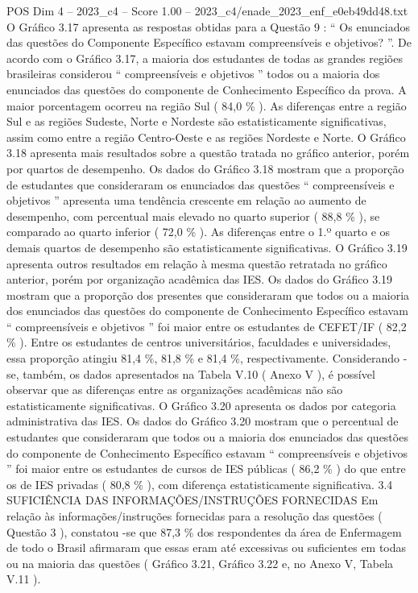 \begin{textsample}{POS Dim 4 – 2023\_c4 – Score 1.00 – 2023\_c4/enade\_2023\_enf\_e0eb49dd48.txt}
O Gráfico 3.17 apresenta as respostas obtidas para a Questão 9 : “ Os enunciados das questões do Componente Específico estavam compreensíveis e objetivos? ”.
De acordo com o Gráfico 3.17, a maioria dos estudantes de todas as grandes regiões brasileiras considerou “ compreensíveis e objetivos ” todos ou a maioria dos enunciados das questões do componente de Conhecimento Específico da prova.
A maior porcentagem ocorreu na região Sul ( 84,0 \% ).
As diferenças entre a região Sul e as regiões Sudeste, Norte e Nordeste são estatisticamente significativas, assim como entre a região Centro-Oeste e as regiões Nordeste e Norte.
O Gráfico 3.18 apresenta mais resultados sobre a questão tratada no gráfico anterior, porém por quartos de desempenho.
Os dados do Gráfico 3.18 mostram que a proporção de estudantes que consideraram os enunciados das questões “ compreensíveis e objetivos ” apresenta uma tendência crescente em relação ao aumento de desempenho, com percentual mais elevado no quarto superior ( 88,8 \% ), se comparado ao quarto inferior ( 72,0 \% ).
As diferenças entre o 1.º quarto e os demais quartos de desempenho são estatisticamente significativas.
O Gráfico 3.19 apresenta outros resultados em relação à mesma questão retratada no gráfico anterior, porém por organização acadêmica das IES.
Os dados do Gráfico 3.19 mostram que a proporção dos presentes que consideraram que todos ou a maioria dos enunciados das questões do componente de Conhecimento Específico estavam “ compreensíveis e objetivos ” foi maior entre os estudantes de CEFET/IF ( 82,2 \% ).
Entre os estudantes de centros universitários, faculdades e universidades, essa proporção atingiu 81,4 \%, 81,8 \% e 81,4 \%, respectivamente.
Considerando -se, também, os dados apresentados na Tabela V.10 ( Anexo V ), é possível observar que as diferenças entre as organizações acadêmicas não são estatisticamente significativas.
O Gráfico 3.20 apresenta os dados por categoria administrativa das IES.
Os dados do Gráfico 3.20 mostram que o percentual de estudantes que consideraram que todos ou a maioria dos enunciados das questões do componente de Conhecimento Específico estavam “ compreensíveis e objetivos ” foi maior entre os estudantes de cursos de IES públicas ( 86,2 \% ) do que entre os de IES privadas ( 80,8 \% ), com diferença estatisticamente significativa. 3.4 SUFICIÊNCIA DAS INFORMAÇÕES/INSTRUÇÕES FORNECIDAS Em relação às informações/instruções fornecidas para a resolução das questões ( Questão 3 ), constatou -se que 87,3 \% dos respondentes da área de Enfermagem de todo o Brasil afirmaram que essas eram até excessivas ou suficientes em todas ou na maioria das questões ( Gráfico 3.21, Gráfico 3.22 e, no Anexo V, Tabela V.11 ).

\end{textsample}
